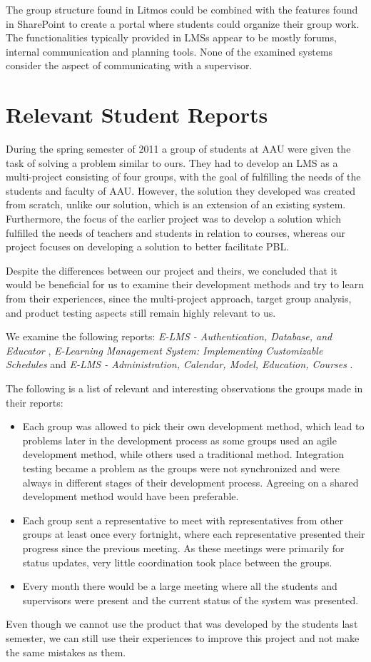 The group structure found in Litmos could be combined with the features found in SharePoint to create a portal where students could organize their group work.
The functionalities typically provided in LMSs appear to be mostly forums, internal communication and planning tools.
None of the examined systems consider the aspect of communicating with a supervisor.

\section{Relevant Student Reports}
\label{sec:prevwork}
During the spring semester of 2011 a group of students at AAU were given the task of solving a problem similar to ours. 
They had to develop an LMS as a multi-project consisting of four groups, with the goal of fulfilling the needs of the students and faculty of AAU.
However, the solution they developed was created from scratch, unlike our solution, which is an extension of an existing system.
Furthermore, the focus of the earlier project was to develop a solution which fulfilled the needs of teachers and students in relation to courses, whereas our project focuses on developing a solution to better facilitate PBL.

Despite the differences between our project and theirs, we concluded that it would be beneficial for us to examine their development methods and try to learn from their experiences, since the multi-project approach, target group analysis, and product testing aspects still remain highly relevant to us. 

We examine the following reports: \emph{E-LMS - Authentication, Database, and Educator} \cite{E-LMS-ADE},  \emph{E-Learning Management System: Implementing Customizable Schedules} \cite{E-LMS-ICS} and \emph{E-LMS - Administration, Calendar, Model, Education, Courses} \cite{E-LMS-ACMEC}.

The following is a list of relevant and interesting observations the groups made in their reports:
\begin{itemize}
	\item{Each group was allowed to pick their own development method, which lead to problems later in the development process as some groups used an agile development method, while others used a traditional method. 
	Integration testing became a problem as the groups were not synchronized and were always in different stages of their development process. 
	Agreeing on a shared development method would have been preferable.}
	\item{Each group sent a representative to meet with representatives from other groups at least once every fortnight, where each representative presented their progress since the previous meeting. 
	As these meetings were primarily for status updates, very little coordination took place between the groups.}
	\item{Every month there would be a large meeting where all the students and supervisors were present and the current status of the system was presented.}
\end{itemize}

Even though we cannot use the product that was developed by the students last semester, we can still use their experiences to improve this project and not make the same mistakes as them.
